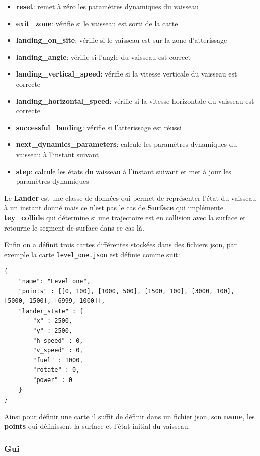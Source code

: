 \documentclass[french,a4paper,10pt,twocolumn]{article}
\begin{document}
\begin{itemize}
    \item \textbf{reset}: remet à zéro les paramètres dynamiques du vaisseau
        \item \textbf{exit\_zone}: vérifie si le vaisseau est sorti de la carte
        \item \textbf{landing\_on\_site}: vérifie si le vaisseau est sur la zone d'atterissage
        \item \textbf{landing\_angle}: vérifie si l'angle du vaisseau est correct
        \item \textbf{landing\_vertical\_speed}: vérifie si la vitesse verticale du vaisseau est correcte
        \item \textbf{landing\_horizontal\_speed}: vérifie si la vitesse horizontale du vaisseau est correcte
        \item \textbf{successful\_landing}: vérifie si l'atterissage est réussi
        \item \textbf{next\_dynamics\_parameters}: calcule les paramètres dynamiques du vaisseau à l'instant suivant
        \item \textbf{step}: calcule les états du vaisseau à l'instant suivant et met à jour les paramètres dynamiques
\end{itemize}


Le \textbf{Lander} est une classe de données qui permet de représenter l'état du vaisseau à un instant donné
mais ce n'est pas le cas de \textbf{Surface} qui implémente \textbf{tey\_collide} qui détermine si une trajectoire est en collision avec la surface 
et retourne le segment de surface dans ce cas là.

Enfin on a définit trois cartes différentes stockées dans des fichiers json, par exemple la carte \texttt{level\_one.json} est définie comme suit:

\begin{lstlisting}
{   
    "name": "Level one",
    "points" : [[0, 100], [1000, 500], [1500, 100], [3000, 100], [5000, 1500], [6999, 1000]],
    "lander_state" : {
        "x" : 2500,
        "y" : 2500,
        "h_speed" : 0, 
        "v_speed" : 0,
        "fuel" : 1000,
        "rotate" : 0,
        "power" : 0
    }
}
\end{lstlisting}

Ainsi pour définir une carte il suffit de définir dans un fichier json, son \textbf{name}, les \textbf{points} qui définissent la surface et l'état initial du vaisseau.

\subsubsection{Gui}
\end{document}
